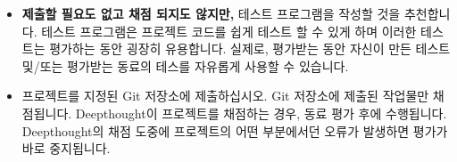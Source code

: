 \begin{itemize}
      \item \textbf{제출할 필요도 없고 채점 되지도 않지만,} 테스트 프로그램을 작성할 것을 추천합니다. 테스트 프로그램은 프로젝트 코드를 쉽게 테스트 할 수 있게 하며  이러한 테스트는 평가하는 동안 굉장히 유용합니다. 실제로, 평가받는 동안 자신이 만든 테스트 및/또는 평가받는 동료의 테스를 자유롭게 사용할 수 있습니다.

      \item 프로젝트를 지정된 Git 저장소에 제출하십시오. Git 저장소에 제출된 작업물만 채점됩니다. Deepthought이 프로젝트를 채점하는 경우, 동료 평가 후에 수행됩니다. Deepthought의 채점 도중에 프로젝트의 어떤 부분에서던 오류가 발생하면 평가가 바로 중지됩니다.
      
    \end{itemize}


